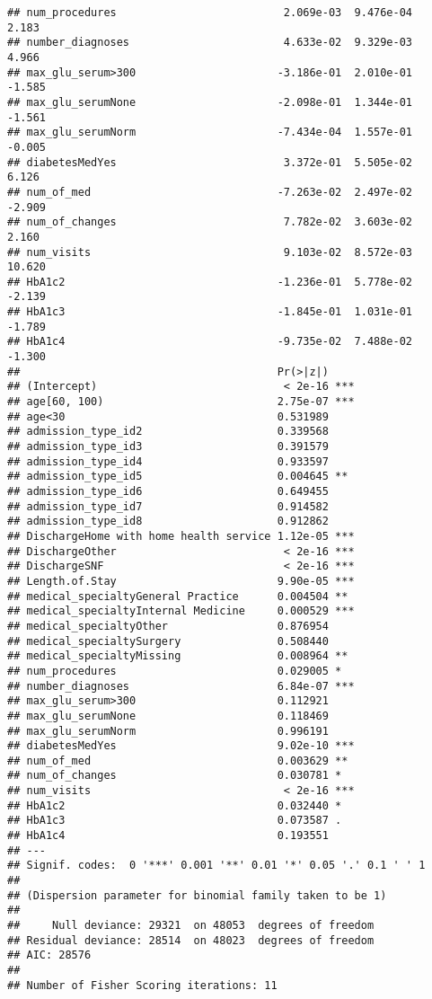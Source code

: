 \documentclass[
]{article}
\begin{document}
\begin{verbatim}
## num_procedures                          2.069e-03  9.476e-04   2.183
## number_diagnoses                        4.633e-02  9.329e-03   4.966
## max_glu_serum>300                      -3.186e-01  2.010e-01  -1.585
## max_glu_serumNone                      -2.098e-01  1.344e-01  -1.561
## max_glu_serumNorm                      -7.434e-04  1.557e-01  -0.005
## diabetesMedYes                          3.372e-01  5.505e-02   6.126
## num_of_med                             -7.263e-02  2.497e-02  -2.909
## num_of_changes                          7.782e-02  3.603e-02   2.160
## num_visits                              9.103e-02  8.572e-03  10.620
## HbA1c2                                 -1.236e-01  5.778e-02  -2.139
## HbA1c3                                 -1.845e-01  1.031e-01  -1.789
## HbA1c4                                 -9.735e-02  7.488e-02  -1.300
##                                        Pr(>|z|)    
## (Intercept)                             < 2e-16 ***
## age[60, 100)                           2.75e-07 ***
## age<30                                 0.531989    
## admission_type_id2                     0.339568    
## admission_type_id3                     0.391579    
## admission_type_id4                     0.933597    
## admission_type_id5                     0.004645 ** 
## admission_type_id6                     0.649455    
## admission_type_id7                     0.914582    
## admission_type_id8                     0.912862    
## DischargeHome with home health service 1.12e-05 ***
## DischargeOther                          < 2e-16 ***
## DischargeSNF                            < 2e-16 ***
## Length.of.Stay                         9.90e-05 ***
## medical_specialtyGeneral Practice      0.004504 ** 
## medical_specialtyInternal Medicine     0.000529 ***
## medical_specialtyOther                 0.876954    
## medical_specialtySurgery               0.508440    
## medical_specialtyMissing               0.008964 ** 
## num_procedures                         0.029005 *  
## number_diagnoses                       6.84e-07 ***
## max_glu_serum>300                      0.112921    
## max_glu_serumNone                      0.118469    
## max_glu_serumNorm                      0.996191    
## diabetesMedYes                         9.02e-10 ***
## num_of_med                             0.003629 ** 
## num_of_changes                         0.030781 *  
## num_visits                              < 2e-16 ***
## HbA1c2                                 0.032440 *  
## HbA1c3                                 0.073587 .  
## HbA1c4                                 0.193551    
## ---
## Signif. codes:  0 '***' 0.001 '**' 0.01 '*' 0.05 '.' 0.1 ' ' 1
## 
## (Dispersion parameter for binomial family taken to be 1)
## 
##     Null deviance: 29321  on 48053  degrees of freedom
## Residual deviance: 28514  on 48023  degrees of freedom
## AIC: 28576
## 
## Number of Fisher Scoring iterations: 11
\end{verbatim}
\end{document}
